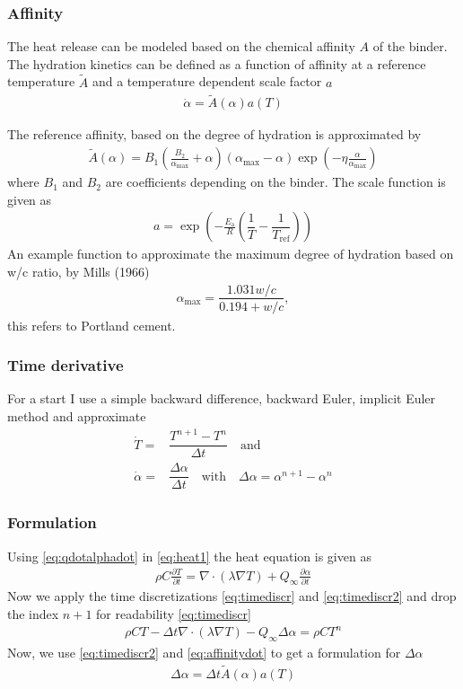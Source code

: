\subsubsection{Affinity}
The heat release can be modeled based on the chemical affinity $A$ of the binder.
The hydration kinetics can be defined as a function of affinity at a reference temperature $\tilde{A}$ and a temperature dependent scale factor ${a}$
\begin{align}
	\dot{\alpha} = \tilde{A}(\alpha){a}(T)\label{eq:affinitydot}
\end{align}


The reference affinity, based on the degree of hydration is approximated by
\begin{align}
	\tilde{A}(\alpha) = B_1 \left(\frac{B_2}{\alpha_{\text{max}}} + \alpha\right) (\alpha_{\text{max}} - \alpha)\exp\left(-\eta \frac{\alpha}{\alpha_{\text{max}}}\right)
\end{align}
where $B_1$ and $B_2$ are coefficients depending on the binder.
The scale function is given as
\begin{align}
	a = \exp\left(-\frac{E_{\text{a}}}{R}\left(\dfrac{1}{T}-\dfrac{1}{T_{\text{ref}}}\right)\right)
\end{align}
An example function to approximate the maximum degree of hydration based on w/c ratio, by Mills (1966)
\begin{align}
	\alpha_{\text{max}} = \dfrac{1.031w/c}{0.194 + w/c},
\end{align}
this refers to Portland cement. 
\subsubsection{Time derivative}
For a start I use a simple backward difference, backward Euler, implicit Euler method and approximate
\begin{align}
	\dot{T} =& \dfrac{T^{n+1}-T^{n}}{\Delta t} \quad\text{and}\label{eq:timediscr}\\
	\dot{\alpha} =& \dfrac{\Delta\alpha}{\Delta t}  \quad\text{with}\quad
	\Delta\alpha = \alpha^{n+1}-\alpha^{n}
	\label{eq:timediscr2}
\end{align}
\subsubsection{Formulation}
Using \eqref{eq:qdotalphadot} in \eqref{eq:heat1}
the heat equation is given as
\begin{align}
	\rho C\frac{\partial T}{\partial t} = \nabla \cdot (\lambda \nabla T) + Q_{\infty}\frac{\partial \alpha}{\partial t} 
\end{align}
Now we apply the time discretizations \eqref{eq:timediscr} and \eqref{eq:timediscr2} and drop the index $n+1$ for readability \eqref{eq:timediscr}
\begin{align}
	\rho C T  - {\Delta t} \nabla \cdot (\lambda \nabla T) - Q_{\infty}\Delta\alpha
	= \rho C T^{n}   \label{eq:heat2}
\end{align}
Now, we use \eqref{eq:timediscr2} and \eqref{eq:affinitydot} to get a formulation for $\Delta\alpha$
\begin{align}
	\Delta\alpha = \Delta t \tilde{A}(\alpha)a(T) \label{eq:deltaalpha}
\end{align}
